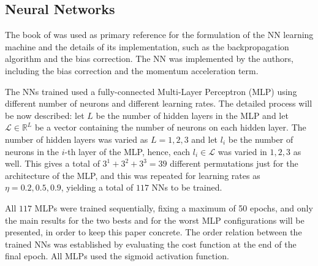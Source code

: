 \documentclass[conference]{IEEEtran}
\theoremstyle{definition}
\theoremstyle{remark}
\theoremstyle{remark}
\begin{document}
\subsection{Neural Networks}
The book of \textcite{aggarwal2018} was used as primary reference for the
formulation of the NN learning machine and the details of its implementation,
such as the backpropagation algorithm and the bias correction.
The NN was implemented by the authors, including the bias correction and the
momentum acceleration term.

The NNs trained used a fully-connected Multi-Layer Perceptron (MLP) using
different number of neurons and different learning rates. The detailed process
will be now described: let $L$ be the number of hidden layers in the MLP and let
$\mathcal{L}\in\mathbb{R}^{L}$ be a vector containing the number of neurons on
each hidden layer. The number of hidden layers was varied as $L=1,2,3$ and let
$l_i$ be the number of neurons in the $i$-th layer of the MLP, hence, each
$l_i\in\mathcal{L}$ was varied in $1,2,3$ as well. This gives a total of
$3^1+3^2+3^3=39$ different permutations just for the architecture of the MLP,
and this was repeated for learning rates as $\eta=0.2,0.5,0.9$, yielding a total
of $117$ NNs to be trained.

All $117$ MLPs were trained sequentially, fixing a maximum of 50 epochs,
and only the main results for the two bests and for the worst MLP configurations
will be presented, in order to keep this paper concrete. The order relation
between the trained NNs was established by evaluating the cost function at the
end of the final epoch. All MLPs used the sigmoid activation function.
\end{document}
